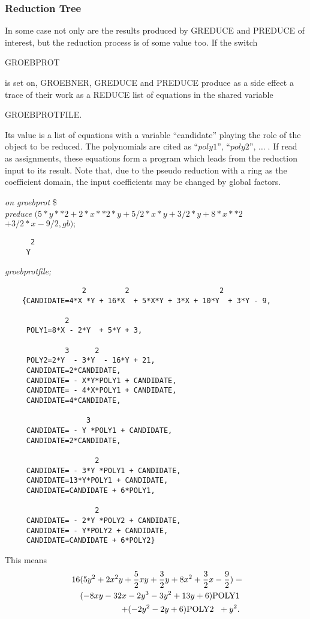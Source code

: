 \subsubsection{Reduction Tree}
In some case not only are the results produced by GREDUCE and
PREDUCE of interest, but the reduction process is of some value
too. If the switch
\begin{center}
GROEBPROT
\end{center}
is set on, GROEBNER, GREDUCE and PREDUCE produce as a side effect a trace of
their work as a REDUCE list of equations in the shared variable
\begin{center}
GROEBPROTFILE.
\end{center}
Its value is a list of equations with a variable ``candidate'' playing
the role of the object to be reduced. The polynomials are cited as
``$poly1$'', ``$poly2$'', $\ldots\;$. If read as assignments, these equations
form a program which leads from the reduction input to its result.
Note that, due to the pseudo reduction with a ring as the coefficient
domain, the input coefficients may be changed by global factors.

\example {}

{\it on groebprot} \$ \\
{\it preduce} $ (5*y**2 + 2*x**2*y + 5/2*x*y + 3/2*y + 8*x**2 $ \\
\hspace*{+1cm} $+ 3/2*x - 9/2, gb);$
\begin{verbatim}
      2
     Y
\end{verbatim}
{\it groebprotfile;}
\begin{verbatim}
                  2         2                     2
    {CANDIDATE=4*X *Y + 16*X  + 5*X*Y + 3*X + 10*Y  + 3*Y - 9,

              2
     POLY1=8*X - 2*Y  + 5*Y + 3,

              3      2
     POLY2=2*Y  - 3*Y  - 16*Y + 21,
     CANDIDATE=2*CANDIDATE,
     CANDIDATE= - X*Y*POLY1 + CANDIDATE,
     CANDIDATE= - 4*X*POLY1 + CANDIDATE,
     CANDIDATE=4*CANDIDATE,

                   3
     CANDIDATE= - Y *POLY1 + CANDIDATE,
     CANDIDATE=2*CANDIDATE,

                     2
     CANDIDATE= - 3*Y *POLY1 + CANDIDATE,
     CANDIDATE=13*Y*POLY1 + CANDIDATE,
     CANDIDATE=CANDIDATE + 6*POLY1,

                     2
     CANDIDATE= - 2*Y *POLY2 + CANDIDATE,
     CANDIDATE= - Y*POLY2 + CANDIDATE,
     CANDIDATE=CANDIDATE + 6*POLY2}

 \end{verbatim}
This means
\begin{eqnarray*}
\lefteqn{
16 (5 y^2 + 2 x^2 y + \frac{5}{2} x y + \frac{3}{2} y
+ 8 x^2+ \frac{3}{2} x - \frac{9}{2})=} \\ & &
(-8 x y -32 x -2 y^3 -3 y^2 + 13 y + 6) \mbox{POLY1} \\
& & \; + (-2 y^2 -2 y + 6) \mbox{POLY2  } \; + y^2.
\end{eqnarray*}



